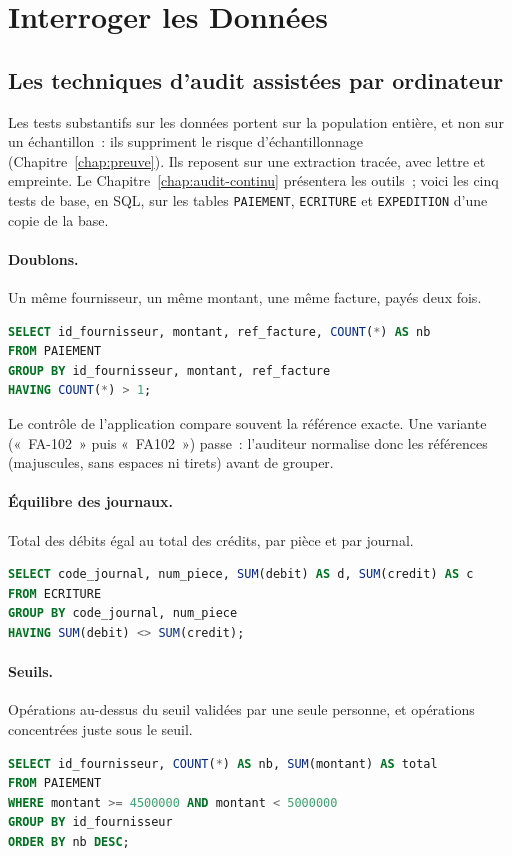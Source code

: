 \section{Interroger les Données}
\label{sec:c18-donnees}

\subsection{Les techniques d'audit assistées par ordinateur}

Les tests substantifs sur les données portent sur la population entière,
et non sur un échantillon~: ils suppriment le risque d'échantillonnage
(Chapitre~\ref{chap:preuve}). Ils reposent sur une extraction tracée, avec
lettre et empreinte. Le Chapitre~\ref{chap:audit-continu} présentera les
outils~; voici les cinq tests de base, en SQL, sur les tables
\texttt{PAIEMENT}, \texttt{ECRITURE} et \texttt{EXPEDITION} d'une copie de
la base.

\paragraph{Doublons.} Un même fournisseur, un même montant, une même
facture, payés deux fois.
\begin{lstlisting}[language=SQL]
SELECT id_fournisseur, montant, ref_facture, COUNT(*) AS nb
FROM PAIEMENT
GROUP BY id_fournisseur, montant, ref_facture
HAVING COUNT(*) > 1;
\end{lstlisting}

Le contrôle de l'application compare souvent la référence exacte. Une
variante («~FA-102~» puis «~FA102~») passe~: l'auditeur normalise donc les
références (majuscules, sans espaces ni tirets) avant de grouper.

\paragraph{Équilibre des journaux.} Total des débits égal au total des
crédits, par pièce et par journal.
\begin{lstlisting}[language=SQL]
SELECT code_journal, num_piece, SUM(debit) AS d, SUM(credit) AS c
FROM ECRITURE
GROUP BY code_journal, num_piece
HAVING SUM(debit) <> SUM(credit);
\end{lstlisting}

\paragraph{Seuils.} Opérations au-dessus du seuil validées par une seule
personne, et opérations concentrées juste sous le seuil.
\begin{lstlisting}[language=SQL]
SELECT id_fournisseur, COUNT(*) AS nb, SUM(montant) AS total
FROM PAIEMENT
WHERE montant >= 4500000 AND montant < 5000000
GROUP BY id_fournisseur
ORDER BY nb DESC;
\end{lstlisting}

